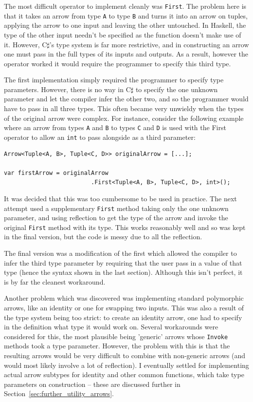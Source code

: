 \documentclass[12pt,twoside,notitlepage]{report}
\begin{document}
The most difficult operator to implement cleanly was \texttt{First}. The problem here is that it takes an arrow from type \texttt{A} to type \texttt{B} and turns it into an arrow on tuples, applying the arrow to one input and leaving the other untouched. In Haskell, the type of the other input needn't be specified as the function doesn't make use of it. However, C$\sharp$'s type system is far more restrictive, and in constructing an arrow one must pass in the full types of its inputs and outputs. As a result, however the operator worked it would require the programmer to specify this third type.

The first implementation simply required the programmer to specify type parameters. However, there is no way in C$\sharp$ to specify the one unknown parameter and let the compiler infer the other two, and so the programmer would have to pass in all three types. This often became very unwieldy when the types of the original arrow were complex. For instance, consider the following example where an arrow from types \texttt{A} and \texttt{B} to types \texttt{C} and \texttt{D} is used with the First operator to allow an \texttt{int} to pass alongside as a third parameter:

\begin{lstlisting}[language={[Sharp]C}]
Arrow<Tuple<A, B>, Tuple<C, D>> originalArrow = [...];

var firstArrow = originalArrow
                         .First<Tuple<A, B>, Tuple<C, D>, int>();
\end{lstlisting}

It was decided that this was too cumbersome to be used in practice. The next attempt used a supplementary \texttt{First} method taking only the one unknown parameter, and using reflection to get the type of the arrow and invoke the original \texttt{First} method with its type. This works reasonably well and so was kept in the final version, but the code is messy due to all the reflection.

The final version was a modification of the first which allowed the compiler to infer the third type parameter by requiring that the user pass in a value of that type (hence the syntax shown in the last section). Although this isn't perfect, it is by far the cleanest workaround.

Another problem which was discovered was implementing standard polymorphic arrows, like an identity or one for swapping two inputs. This was also a result of the type system being too strict: to create an identity arrow, one had to specify in the definition what type it would work on. Several workarounds were considered for this, the most plausible being 'generic' arrows whose \texttt{Invoke} methods took a type parameter. However, the problem with this is that the resulting arrows would be very difficult to combine with non-generic arrows (and would most likely involve a lot of reflection). I eventually settled for implementing actual arrow subtypes for identity and other common functions, which take type parameters on construction -- these are discussed further in Section~\ref{sec:further_utility_arrows}.
\end{document}
